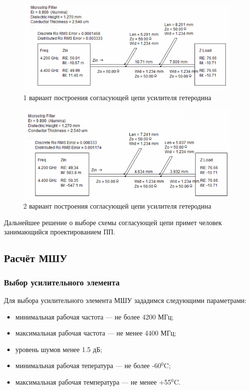 \documentclass[utf8x, 14pt, oneside, a4paper]{article}
\begin{document}
				\begin{figure}[H]
					\centering
					\includegraphics[width=0.7\linewidth]{"Рисунки/Схемы/Согласование гетеродина А"}
					\caption{1 вариант построения согласующей цепи усилителя гетеродина}
					\label{fig:match3a}
				\end{figure}
				
				\begin{figure}[H]
					\centering
					\includegraphics[width=0.7\linewidth]{"Рисунки/Схемы/Согласование гетеродина Б"}
					\caption{2 вариант построения согласующей цепи усилителя гетеродина}
					\label{fig:match3b}
				\end{figure}
				
				Дальнейшее решение о выборе схемы согласующей цепи примет человек занимающийся проектированием ПП.
			
		\subsection{Расчёт МШУ}
			\subsubsection{Выбор усилительного элемента}
				Для выбора усилительного элемента МШУ зададимся следующими параметрами:
				
				\begin{itemize}
					\item минимальная рабочая частота --- не более 4200 МГц;
					\item максимальная рабочая частота --- не менее 4400 МГц;
					\item уровень шумов менее 1.5 дБ;
					\item минимальная рабочая тепература --- не более -60$^0$C;
					\item максимальная рабочая температура --- не менее +55$^0$C.
				\end{itemize}
				
\end{document}

